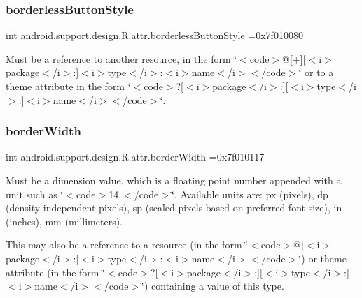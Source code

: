 \subsubsection{\texorpdfstring{borderless\+Button\+Style}{borderlessButtonStyle}}
{\footnotesize\ttfamily int android.\+support.\+design.\+R.\+attr.\+borderless\+Button\+Style =0x7f010080\hspace{0.3cm}{\ttfamily [static]}}

Must be a reference to another resource, in the form \char`\"{}$<$code$>$@\mbox{[}+\mbox{]}\mbox{[}$<$i$>$package$<$/i$>$\+:\mbox{]}$<$i$>$type$<$/i$>$\+:$<$i$>$name$<$/i$>$$<$/code$>$\char`\"{} or to a theme attribute in the form \char`\"{}$<$code$>$?\mbox{[}$<$i$>$package$<$/i$>$\+:\mbox{]}\mbox{[}$<$i$>$type$<$/i$>$\+:\mbox{]}$<$i$>$name$<$/i$>$$<$/code$>$\char`\"{}. \mbox{\label{classandroid_1_1support_1_1design_1_1R_1_1attr_a1e35ba7b8eff870ac522092f0026cafc}} 
\subsubsection{\texorpdfstring{border\+Width}{borderWidth}}
{\footnotesize\ttfamily int android.\+support.\+design.\+R.\+attr.\+border\+Width =0x7f010117\hspace{0.3cm}{\ttfamily [static]}}

Must be a dimension value, which is a floating point number appended with a unit such as \char`\"{}$<$code$>$14.\+5sp$<$/code$>$\char`\"{}. Available units are\+: px (pixels), dp (density-\/independent pixels), sp (scaled pixels based on preferred font size), in (inches), mm (millimeters). 

This may also be a reference to a resource (in the form \char`\"{}$<$code$>$@\mbox{[}$<$i$>$package$<$/i$>$\+:\mbox{]}$<$i$>$type$<$/i$>$\+:$<$i$>$name$<$/i$>$$<$/code$>$\char`\"{}) or theme attribute (in the form \char`\"{}$<$code$>$?\mbox{[}$<$i$>$package$<$/i$>$\+:\mbox{]}\mbox{[}$<$i$>$type$<$/i$>$\+:\mbox{]}$<$i$>$name$<$/i$>$$<$/code$>$\char`\"{}) containing a value of this type. \mbox{\label{classandroid_1_1support_1_1design_1_1R_1_1attr_ac640b00f619be3b2138da92e008fbe7a}} 
